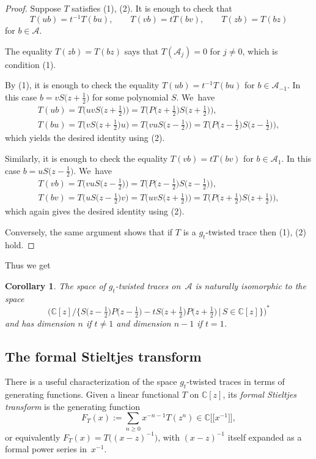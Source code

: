 \documentclass[10pt,a4paper]{amsart}
\newcommand{\CN}{\mathbb{C}} %
\newcommand{\mc}[1]{\mathcal{#1}}
\newtheorem{Corollary}[Theorem]{Corollary}
\theoremstyle{definition}
\numberwithin{equation}{section}
\begin{document}
\begin{proof} Suppose $T$ satisfies (1), (2).
It is enough to check that
\[
T(ub)=t^{-1}T(bu),\qquad T(vb)=tT(bv),\qquad T(zb)=T(bz)
\]
for $b\in \mc{A}$.

The equality $T(zb)=T(bz)$ says that $T(\mc A_j)=0$ for $j\ne 0$, which is condition (1).

By (1), it is enough to check the equality $T(ub)=t^{-1} T(bu)$ for $b\in \mc{A}_{-1}$. In this case $b=vS\big(z+\tfrac{1}{2}\big)$ for some polynomial $S$. We~have
\begin{gather*}
T(ub)=T\big(uvS\big(z+\tfrac{1}{2}\big)\big)=T\big(P\big(z+\tfrac{1}{2}\big)S\big(z+\tfrac{1}{2}\big)\big),
\\
T(bu)=T\big(vS\big(z+\tfrac{1}{2}\big)u\big)=T\big(vu S\big(z-\tfrac{1}{2}\big)\big)=T\big(P\big(z-\tfrac{1}{2}\big)S\big(z-\tfrac{1}{2}\big)\big),
\end{gather*}
which yields the desired identity using (2).

Similarly, it is enough to check the equality $T(vb)=tT(bv)$ for $b\in \mc{A}_1$. In this case $b=u S\big(z-\tfrac{1}{2}\big)$. We~have
\begin{gather*}
T(vb)=T\big(vu S\big(z-\tfrac{1}{2}\big)\big)=T\big(P\big(z-\tfrac{1}{2}\big)S\big(z-\tfrac{1}{2}\big)\big),
\\
T(bv)=T\big(u S\big(z-\tfrac{1}{2}\big)v\big)=T\big(uv S\big(z+\tfrac{1}{2}\big)\big)=T\big(P\big(z+\tfrac{1}{2}\big)S\big(z+\tfrac{1}{2}\big)\big),
\end{gather*}
which again gives the desired identity using (2).

Conversely, the same argument shows that if $T$ is a $g_t$-twisted trace
then (1), (2) hold.
\end{proof}

Thus we get

\begin{Corollary}\label{natiso}
The space of $g_t$-twisted traces on~$\mc A$ is naturally isomorphic to the space
\[
\bigl(\CN[z]/\big\{S\big(z-\tfrac{1}{2}\big)P\big(z-\tfrac{1}{2}\big)-t S\big(z+\tfrac{1}{2}\big)P\big(z+\tfrac{1}{2}\big)\,|\, S \in\CN[z]\big\}\bigr)^*
\]
and has dimension $n$ if $t\neq 1$ and dimension $n-1$ if $t=1$.
\end{Corollary}

\subsection{The formal Stieltjes transform}
There is a useful characterization of the space $g_t$-twisted traces in
terms of generating functions. Given a linear functional $T$ on $\CN[z]$,
its {\em formal Stieltjes transform} is the generating function
\[
F_T(x):=\sum_{n\ge 0} x^{-n-1} T(z^n) \in \CN\big[\big[x^{-1}\big]\big],
\]
or equivalently $F_T(x)=T\big((x-z)^{-1}\big)$, with $(x-z)^{-1}$ itself expanded as a
formal power series in~$x^{-1}$.
\end{document}
